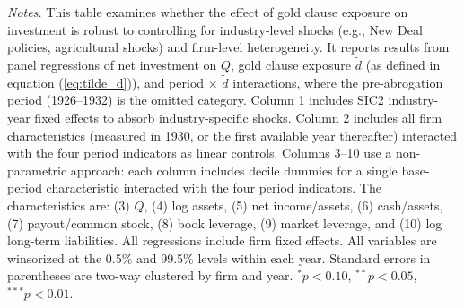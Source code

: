 \begin{landscape}
\begin{table}[t!]
\scriptsize{\textit{Notes.} This table examines whether the effect of gold clause exposure on investment is robust to controlling for industry-level shocks (e.g., New Deal policies, agricultural shocks) and firm-level heterogeneity. It reports results from panel regressions of net investment on $Q$, gold clause exposure $\tilde{d}$ (as defined in equation (\ref{eq:tilde_d})), and period $\times$ $\tilde{d}$ interactions, where the pre-abrogation period (1926--1932) is the omitted category. Column 1 includes SIC2 industry-year fixed effects to absorb industry-specific shocks. Column 2 includes all firm characteristics (measured in 1930, or the first available year thereafter) interacted with the four period indicators as linear controls. Columns 3--10 use a non-parametric approach: each column includes decile dummies for a single base-period characteristic interacted with the four period indicators. The characteristics are: (3) $Q$, (4) log assets, (5) net income/assets, (6) cash/assets, (7) payout/common stock, (8) book leverage, (9) market leverage, and (10) log long-term liabilities. All regressions include firm fixed effects. All variables are winsorized at the 0.5\% and 99.5\% levels within each year. Standard errors in parentheses are two-way clustered by firm and year. $^{*}p<0.10$, $^{**}p<0.05$, $^{***}p<0.01$.}
\end{table}
\end{landscape}